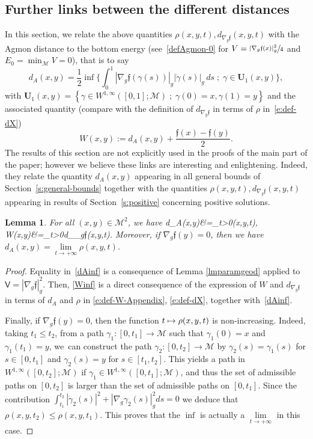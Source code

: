 \documentclass[10pt]{amsart}
\newcommand\mto{\mathchoice{\longmapsto}{\mapsto}{\mapsto}{\mapsto}}
\newcommand{\sep}{\;;\;}
\newtheorem{lemma}{Lemma}[section]
\theoremstyle{definition}
\newcommand{\M}{\ensuremath{\mathcal M}}
\newcommand{\f}{\ensuremath{\mathfrak{f}}}
\def\baln#1\naln{\begin{align}#1\end{align}}
\newcommand\bnp{\begin{proof}}
\newcommand\enp{\end{proof}}
\newcommand\nablag{\nabla_{g}}
\begin{document}
\subsection{Further links between the different distances}
\label{s:app-further-links}
In this section, we relate the above quantities $\rho(x,y,t), d_{\nablag \f}(x,y,t)$ with the Agmon distance to the bottom energy (see~\ref{defAgmon-0} for $V = \sfrac{| \nabla_g \f(x)|_g^2}{4}$ and $E_0 = \min_\M V = 0$), that is to say
\begin{equation}
\label{e:def-dA-Appendix}
d_{A}(x,y) = \frac12 \inf \biggl\{ \int_0^1|\nabla_g \f(\gamma(s))|_g |\dot{\gamma}(s)|_g\, ds\sep \gamma \in \mathbf{U}_1(x,y) \biggr\},
\end{equation}
with $\mathbf{U}_1(x,y)= \left\{ \gamma \in W^{1,\infty} ([0,1] ; \M )\sep\gamma(0)=x, \gamma(1)= y \right\}$ and the associated quantity (compare with the definition of $d_{\nablag \f}$ in terms of $\rho$ in~\eqref{e:def-dX})\enlargethispage{-\baselineskip}%
\begin{equation}
\label{e:def-W-Appendix}
W(x,y) := d_{A}(x,y)+\frac{\f(x)-\f(y)}{2}.
\end{equation}
The results of this section are not explicitly used in the proofs of the main part of the paper; however we believe these links are interesting and enlightening. Indeed, they relate the quantity $d_{A}(x,y)$ appearing in all general bounds of Section~\ref{s:general-bounds} together with the quantities $\rho(x,y,t), d_{\nablag \f}(x,y,t)$ appearing in results of Section~\ref{s:positive} concerning positive solutions.
\begin{lemma}
For all $(x,y)\in \M^2$, we have
\baln
\label{dAinf}
d_{A}(x,y)&=\inf_{t>0}\rho(x,y,t),\\
\label{Winf}W(x,y)&=\inf_{t>0}d_{\nablag \f}(x,y,t).
\naln
Moreover, if $\nabla_g\f(y)=0$, then we have $d_{A}(x,y) =\underset{t\to+\infty}{\lim}\rho(x,y,t)$.

\end{lemma}
\bnp
Equality in~\eqref{dAinf} is a consequence of Lemma \ref{lmparamgeod} applied to $\mathsf{V}=|\nabla_g\f|_g^2$.
Then, \eqref{Winf} is a direct consequence of the expression of $W$ and $d_{\nablag \f}$ in terms of $d_A$ and $\rho$ in \eqref{e:def-W-Appendix}, \eqref{e:def-dX}, together with~\eqref{dAinf}.

Finally, if $\nabla_g\f(y)=0$, then the function $t\mto \rho(x,y,t)$ is non-increasing. Indeed, taking $t_1\leq t_2$, from a path $\gamma_1: [0,t_1]\to \M$ such that $\gamma_1(0)=x$ and $\gamma_1(t_1)=y$, we~can construct the path $\gamma_2:[0,t_2]\to \M$ by $\gamma_2(s)=\gamma_1(s)$ for $s\in [0,t_1]$ and \hbox{$\gamma_2(s) = y$} for $s\in[t_1,t_2]$. This yields a path in $W^{1,\infty}([0,t_2];\M)$ if $\gamma_1 \in W^{1,\infty}([0,t_1];\M)$, and thus the set of admissible paths on $[0,t_2]$ is larger than the set of admissible paths on $[0,t_1]$. Since the contribution $\int_{t_1}^{t_2} |\dot{\gamma}_2(s)|^2 + |\nabla_g\gamma_2(s)|_g^2 ds= 0$ we deduce that $\rho(x,y,t_2)\leq \rho(x,y,t_1)$. This proves that the $\inf$ is actually a $\underset{t\to+\infty}{\lim}$ in this case.
\enp
\end{document}
